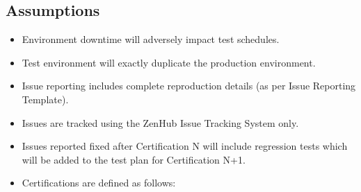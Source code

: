 \documentclass[letterpaper,10pt,english,openany,oneside]{sphinxmanual}
\begin{document}
\subsection{Assumptions}
\label{\detokenize{test_plan/strategy:assumptions}}
\begin{itemize}
\item {} 
Environment downtime will adversely impact test schedules.

\item {} 
Test environment will exactly duplicate the production environment.

\item {} 
Issue reporting includes complete reproduction details (as per Issue Reporting Template).

\item {} 
Issues are tracked using the ZenHub Issue Tracking System only.

\item {} 
Issues reported fixed after Certification N will include regression tests which will be added to the test plan for Certification N+1.

\end{itemize}

\begin{itemize}
\item {} 
Certifications are defined as follows:

\end{itemize}
\end{document}

